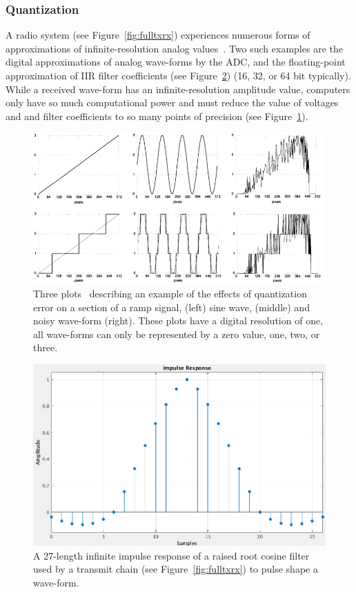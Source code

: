 \subsubsection{Quantization}
\label{quant}
A radio system (see Figure~\ref{fig:fulltxrx}) experiences numerous forms of approximations of infinite-resolution analog values~\cite{quant}. Two such examples are the digital approximations of analog wave-forms by the ADC, and the floating-point approximation of IIR filter coefficients (see Figure~\ref{fig:iir_rrc}) (16, 32, or 64 bit typically). While a received wave-form has an infinite-resolution amplitude value, computers only have so much computational power and must reduce the value of voltages and and filter coefficients to so many points of precision (see Figure~\ref{fig:quant}).

\FloatBarrier
\begin{figure}[ht!]
	\centering	\includegraphics[width=1\textwidth,keepaspectratio]{figs/quant.png}
    \caption{Three plots~\cite{quant} describing an example of the effects of quantization error on a section of a ramp signal, (left) sine wave, (middle) and noisy wave-form (right). These plots have a digital resolution of one, all wave-forms can only be represented by a zero value, one, two, or three.} 
\label{fig:quant}      
\end{figure}
\FloatBarrier

\FloatBarrier
\begin{figure}[ht!]
	\centering	\includegraphics[width=1\textwidth,keepaspectratio]{figs/iir_rrc.png}
    \caption{A 27-length infinite impulse response of a raised root cosine filter used by a transmit chain (see Figure~\ref{fig:fulltxrx}) to pulse shape a wave-form.} 
\label{fig:iir_rrc}      
\end{figure}
\FloatBarrier

